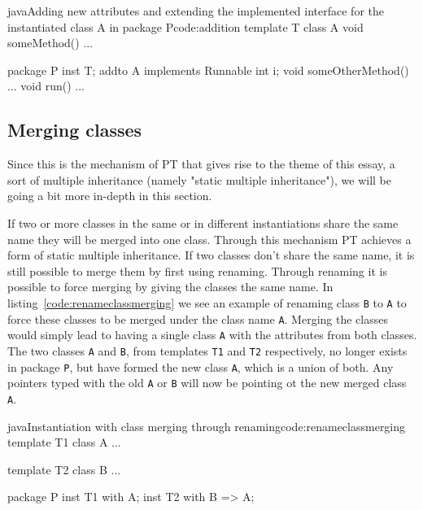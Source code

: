 \begin{code}{java}{Adding new attributes and extending the implemented interface for the instantiated class A in package P}{code:addition}
template T {
    class A {
        void someMethod() { ... }
    }
}

package P {
    inst T;
        addto A implements Runnable {
        int i;
        void someOtherMethod() { ... }
        void run() { ... }
    }
}
\end{code}


\subsection{Merging classes}

Since this is the mechanism of PT that gives rise to the theme of this essay, a sort of multiple inheritance (namely "static multiple inheritance"), we will be going a bit more in-depth in this section.

If two or more classes in the same or in different instantiations share the same name they will be merged into one class.
Through this mechanism PT achieves a form of static multiple inheritance.
If two classes don't share the same name, it is still possible to merge them by first using renaming.
Through renaming it is possible to force merging by giving the classes the same name.
In listing~\vref{code:renameclassmerging} we see an example of renaming class \verb|B| to \verb|A| to force these classes to be merged under the class name \verb|A|.
Merging the classes would simply lead to having a single class \verb|A| with the attributes from both classes.
The two classes \verb|A| and \verb|B|, from templates \verb|T1| and \verb|T2| respectively, no longer exists in package \verb|P|, but have formed the new class \verb|A|, which is a union of both.
Any pointers typed with the old \verb|A| or \verb|B| will now be pointing ot the new merged class \verb|A|.

\begin{code}{java}{Instantiation with class merging through renaming}{code:renameclassmerging}
template T1 {
    class A {
        ...
    }
}

template T2 {
    class B {
        ...
    }
}

package P {
    inst T1 with A;
    inst T2 with B => A;
}
\end{code}

